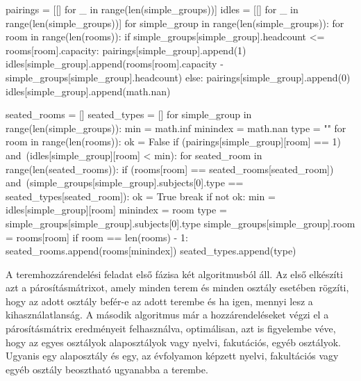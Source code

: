 \begin{python}
	pairings = [[] for _ in range(len(simple_groups))]
	idles = [[] for _ in range(len(simple_groups))]
	for simple_group in range(len(simple_groups)):
	for room in range(len(rooms)):
	if simple_groups[simple_group].headcount <= rooms[room].capacity:
	pairings[simple_group].append(1)
	idles[simple_group].append(rooms[room].capacity -
	simple_groups[simple_group].headcount)
	else:
	pairings[simple_group].append(0)
	idles[simple_group].append(math.nan)
	
	seated_rooms = []
	seated_types = []
	for simple_group in range(len(simple_groups)):
	min = math.inf
	minindex = math.nan
	type = ""
	for room in range(len(rooms)):
	ok = False
	if (pairings[simple_group][room] == 1) and\
	(idles[simple_group][room] < min):
	for seated_room in range(len(seated_rooms)):
	if (rooms[room] == seated_rooms[seated_room]) and\
	(simple_groups[simple_group].subjects[0].type ==
	seated_types[seated_room]):
	ok = True
	break
	if not ok:
	min = idles[simple_group][room]
	minindex = room
	type = simple_groups[simple_group].subjects[0].type
	simple_groups[simple_group].room = rooms[room]
	if room == len(rooms) - 1:
	seated_rooms.append(rooms[minindex])
	seated_types.append(type)
\end{python}

A teremhozzárendelési feladat első fázisa két algoritmusból áll. Az első elkészíti azt a párosításmátrixot, amely minden terem és minden osztály esetében rögzíti, hogy az adott osztály befér-e az adott terembe és ha igen, mennyi lesz a kihasználatlanság. A második algoritmus már a hozzárendeléseket végzi el a párosításmátrix eredményeit felhasználva, optimálisan, azt is figyelembe véve, hogy az egyes osztályok alaposztályok vagy nyelvi, fakutációs, egyéb osztályok. Ugyanis egy alaposztály és egy, az évfolyamon képzett nyelvi, fakultációs vagy egyéb osztály beosztható ugyanabba a terembe.

